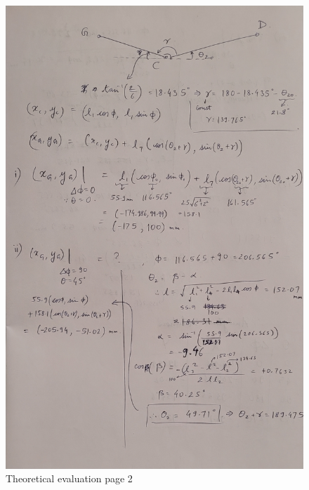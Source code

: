         \begin{figure}[hbt!]
            \centering
            \includegraphics[width=0.9\columnwidth]{Images/Theo_eval2.jpg}
            \caption{Theoretical evaluation page 2}
            \label{fig:theo_eval2}
        \end{figure}

